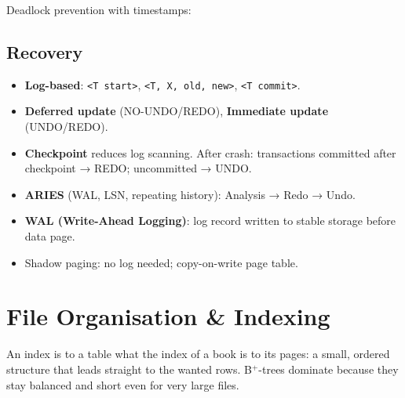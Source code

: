 \endgroup

Deadlock prevention with timestamps:



\needspace{95pt}

\hypertarget{p2-04--recovery}{%
\subsection{Recovery}\label{p2-04--recovery}}

\begin{itemize}
\tightlist
\item
  \textbf{Log-based}: \texttt{\textless{}T\ start\textgreater{}}, \texttt{\textless{}T,\ X,\ old,\ new\textgreater{}}, \texttt{\textless{}T\ commit\textgreater{}}.
\item
  \textbf{Deferred update} (NO-UNDO/REDO), \textbf{Immediate update} (UNDO/REDO).
\item
  \textbf{Checkpoint} reduces log scanning. After crash: transactions committed after checkpoint → REDO; uncommitted → UNDO.
\item
  \textbf{ARIES} (WAL, LSN, repeating history): Analysis → Redo → Undo.
\item
  \textbf{WAL (Write-Ahead Logging)}: log record written to stable storage before data page.
\item
  Shadow paging: no log needed; copy-on-write page table.
\end{itemize}

\needspace{160pt}

\hypertarget{p2-04--8-file-organisation--indexing}{%
\section{File Organisation \& Indexing}\label{p2-04--8-file-organisation--indexing}}

An index is to a table what the index of a book is to its pages: a small, ordered structure that leads
straight to the wanted rows. B\(^{+}\)-trees dominate because they stay balanced and short even for very large
files.

\begingroup\small

